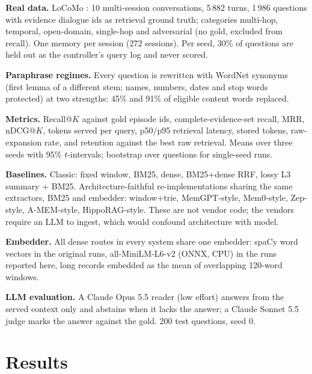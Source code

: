 \documentclass[conference]{IEEEtran}
\begin{document}
\textbf{Real data.} LoCoMo \cite{locomo}: 10 multi-session conversations, 5\,882 turns, 1\,986 questions with evidence dialogue ids as retrieval ground truth; categories multi-hop, temporal, open-domain, single-hop and adversarial (no gold, excluded from recall). One memory per session (272 sessions). Per seed, 30\% of questions are held out as the controller's query log and never scored.

\textbf{Paraphrase regimes.} Every question is rewritten with WordNet synonyms (first lemma of a different stem; names, numbers, dates and stop words protected) at two strengths: 45\% and 91\% of eligible content words replaced.

\textbf{Metrics.} Recall@$K$ against gold episode ids, complete-evidence-set recall, MRR, nDCG@$K$, tokens served per query, p50/p95 retrieval latency, stored tokens, raw-expansion rate, and retention against the best raw retrieval. Means over three seeds with 95\% $t$-intervals; bootstrap over questions for single-seed runs.

\textbf{Baselines.} Classic: fixed window, BM25, dense, BM25+dense RRF, lossy L3 summary + BM25. Architecture-faithful re-implementations sharing the same extractors, BM25 and embedder: window+trie, MemGPT-style, Mem0-style, Zep-style, A-MEM-style, HippoRAG-style. These are not vendor code; the vendors require an LLM to ingest, which would confound architecture with model.

\textbf{Embedder.} All dense routes in every system share one embedder: spaCy word vectors in the original runs, all-MiniLM-L6-v2 (ONNX, CPU) in the runs reported here, long records embedded as the mean of overlapping 120-word windows.

\textbf{LLM evaluation.} A Claude Opus 5.5 reader (low effort) answers from the served context only and abstains when it lacks the answer; a Claude Sonnet 5.5 judge marks the answer against the gold. 200 test questions, seed 0.

\section{Results}
\end{document}
